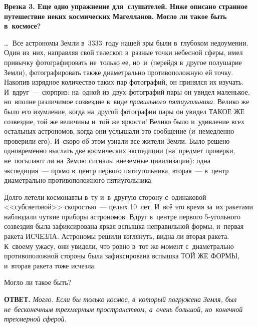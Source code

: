
\newpage

\medskip

\hrulefill

\smallskip

\textbf{Врезка 3.
Еще одно \textbf{упражнение} для~слушателей. Ниже описано странное путешествие неких космических Магелланов.
Могло ли такое быть в~космосе?}

\ldots\ Все астрономы Земли в~3333~году нашей эры были в~глубоком недоумении. Один из~них,
направляя свой телескоп в~разные точки небесной сферы, имел привычку фотографировать не~только ее,
но~и~(перейдя в~другое полушарие Земли), фотографировать также диаметрально противоположную ей
точку. Накопив изрядное количество таких пар фотографий, он принялся их изучать. И~вдруг~---
сюрприз: на~одной из~двух фотографий пары он увидел маленькое, но~вполне различимое созвездие
в~виде \textit{правильного пятиугольника}. Велико же было его изумление, когда на~другой фотографии пары он
увидел ТАКОЕ ЖЕ созвездие, той же величины и~той же яркости! Велико было и~удивление всех остальных
астрономов, когда они услышали это сообщение (и~немедленно проверили его). И~скоро об этом узнали
все жители Земли. Было решено одновременно выслать две космических экспедиции (на~предмет проверки,
не~посылают ли на~Землю сигналы внеземные цивилизации): одна экспедиция~--- прямо в~центр первого
пятиугольника, вторая~--- в~центр диаметрально противоположного пятиугольника.

Долго летели космонавты в~ту и~в~другую сторону с~одинаковой <<субсветовой>> скоростью~--- целых
10~лет. И~всё это время за~их ракетами наблюдали чуткие приборы астрономов. Вдруг в~центре первого
5-угольного созвездия была зафиксирована яркая вспышка неправильной формы, и~первая ракета ИСЧЕЗЛА.
Астрономы решили взглянуть, видна ли вторая ракета. К~своему ужасу, они увидели, что ровно в~тот же
момент с~диаметрально противоположной стороны была зафиксирована вспышка ТОЙ ЖЕ ФОРМЫ, и~вторая
ракета тоже исчезла.

Могло ли такое быть?

\textbf{ОТВЕТ.} \textit{Могло. Если бы только космос, в~который погружена Земля, был не~бесконечным трехмерным
пространством, а~очень большой, но~конечной трехмерной сферой.}

